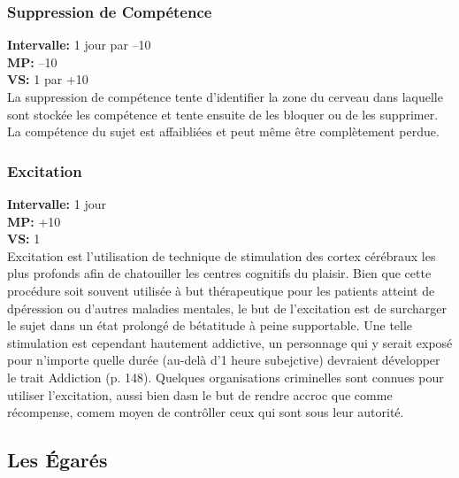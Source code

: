 \subsubsection{Suppression de Compétence} \textbf{Intervalle:} 1 jour par –10 \\ \textbf{MP:} –10 \\ \textbf{VS:} 1 par +10\\ La suppression de compétence tente d'identifier la zone du cerveau dans laquelle sont stockée les compétence et tente ensuite de les bloquer ou de les supprimer. La compétence du sujet est affaibliées et peut même être complètement perdue. 

\subsubsection{Excitation} \textbf{Intervalle:} 1 jour \\ \textbf{MP:} +10 \\ \textbf{VS:} 1 \\ Excitation est l'utilisation de technique de stimulation des cortex cérébraux les plus profonds afin de chatouiller les centres cognitifs du plaisir. Bien que cette procédure soit souvent utilisée à but thérapeutique pour les patients atteint de dpéression ou d'autres maladies mentales, le but de l'excitation est de surcharger le sujet dans un état prolongé de bétatitude à peine supportable. Une telle stimulation est cependant hautement addictive, un personnage qui y serait exposé pour n'importe quelle durée (au-delà d'1 heure subejctive) devraient développer le trait Addiction (p. 148). Quelques organisations criminelles sont connues pour utiliser l'excitation, aussi bien dasn le but de rendre accroc que comme récompense, comem moyen de contrôller ceux qui sont sous leur autorité. 



\subsection{Les Égarés} 


